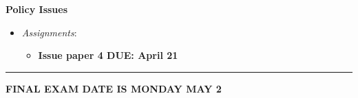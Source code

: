 \week \textbf{Policy Issues}

\begin{itemize}

\item
  \emph{Assignments}:

  \begin{itemize}
  
  \item
    \textbf{Issue paper 4 DUE: April 21}
  \end{itemize}
\end{itemize}

\begin{center}\rule{0.5\linewidth}{0.5pt}\end{center}

\noindent \textbf{FINAL EXAM DATE IS MONDAY MAY 2}
